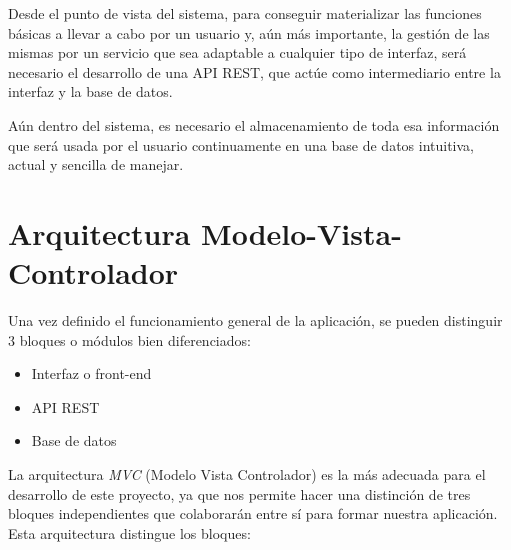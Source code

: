 Desde el punto de vista del sistema, para conseguir materializar las funciones básicas a llevar a cabo por un usuario y, aún más importante, la gestión de las mismas por un servicio que sea adaptable a cualquier tipo de interfaz, será necesario el desarrollo de una API REST, que actúe como intermediario entre la interfaz y la base de datos.

Aún dentro del sistema, es necesario el almacenamiento de toda esa información que será usada por el usuario continuamente en una base de datos intuitiva, actual y sencilla de manejar.


\section{Arquitectura Modelo-Vista-Controlador}

Una vez definido el funcionamiento general de la aplicación, se pueden distinguir 3 bloques o módulos bien diferenciados:

\begin{itemize}
    \item Interfaz o front-end
    \item API REST
    \item Base de datos
\end{itemize}
 
 La arquitectura \textit{MVC} (Modelo Vista Controlador) es la más adecuada para el desarrollo de este proyecto, ya que nos permite hacer una distinción de tres bloques independientes que colaborarán entre sí para formar nuestra aplicación\cite{mvc2}\cite{mvc3}. Esta arquitectura distingue los bloques\cite{mvc1}:
 

